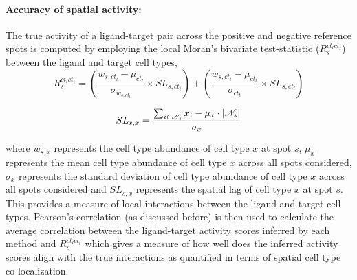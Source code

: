 \paragraph{Accuracy of spatial activity:} The true activity of a ligand-target pair across the positive and negative reference spots is computed by employing the local Moran's bivariate test-statistic ($R_{s}^{ct_l ct_t}$) between the ligand and target cell types,\\
$$R_{s}^{ct_l ct_t} = \left(\frac{w_{s,ct_l} - \mu_{ct_l}}{\sigma_{w_{s,ct_l}}} \times SL_{s, ct_t} \right) + \left(\frac{w_{s,ct_t} - \mu_{ct_t}}{\sigma_{ct_t}} \times SL_{s, ct_l} \right)$$

$$SL_{s, x} = \frac{\sum_{i \in \mathcal{N}_s} x_i - \mu_x \cdot |\mathcal{N}_s|}{\sigma_x} $$

where $w_{s,x}$ represents the cell type abundance of cell type $x$ at spot $s$, $\mu_x$ represents the mean cell type abundance of cell type $x$ across all spots considered, $ \sigma_x$ represents the standard deviation of cell type abundance of cell type $x$ across all spots considered and $SL_{s, x}$ represents the spatial lag of cell type $x$ at spot $s$. This provides a measure of local interactions between the ligand and target cell types. Pearson's correlation (as discussed before) is then used to calculate the average correlation between the ligand-target activity scores inferred by each method and $R_{s}^{ct_l ct_t}$ which gives a measure of how well does the inferred activity scores align with the true interactions as quantified in terms of spatial cell type co-localization.

